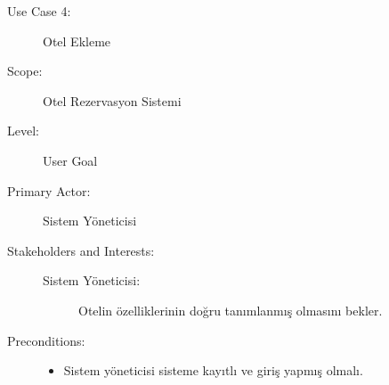 \documentclass[12pt,a4paper]{report}
\begin{document}
\newpage
\begin{description}
\item[Use Case 4:] Otel Ekleme \\
\item[Scope:] Otel Rezervasyon Sistemi
\item[Level:] User Goal
\item[Primary Actor:] Sistem Yöneticisi 
\item[Stakeholders and Interests:] \hspace{10 mm}
\begin{description} 
\item[Sistem Yöneticisi:] Otelin özelliklerinin doğru tanımlanmış olmasını bekler.
\end{description}
\item[Preconditions:] \hspace{10mm}
\begin{itemize}
\item Sistem yöneticisi sisteme kayıtlı ve giriş yapmış olmalı.
\end{itemize}


\end{description}
\end{document}
